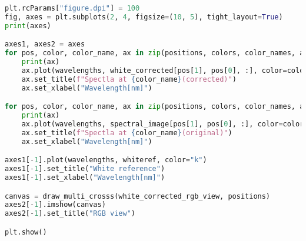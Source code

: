 \begin{lstlisting}[language=python, caption=White correction for Nuance Cmaera with small reference, label={code:wc-nuance-small}]
plt.rcParams["figure.dpi"] = 100
fig, axes = plt.subplots(2, 4, figsize=(10, 5), tight_layout=True)
print(axes)

axes1, axes2 = axes
for pos, color, color_name, ax in zip(positions, colors, color_names, axes2):
    print(ax)
    ax.plot(wavelengths, white_corrected[pos[1], pos[0], :], color=color)
    ax.set_title(f"Spectla at {color_name}(corrected)")
    ax.set_xlabel("Wavelength[nm]")

for pos, color, color_name, ax in zip(positions, colors, color_names, axes1):
    print(ax)
    ax.plot(wavelengths, spectral_image[pos[1], pos[0], :], color=color)
    ax.set_title(f"Spectla at {color_name}(original)")
    ax.set_xlabel("Wavelength[nm]")

axes1[-1].plot(wavelengths, whiteref, color="k")
axes1[-1].set_title("White reference")
axes1[-1].set_xlabel("Wavelength[nm]")

canvas = draw_multi_crosss(white_corrected_rgb_view, positions)
axes2[-1].imshow(canvas)
axes2[-1].set_title("RGB view")

plt.show()
\end{lstlisting}